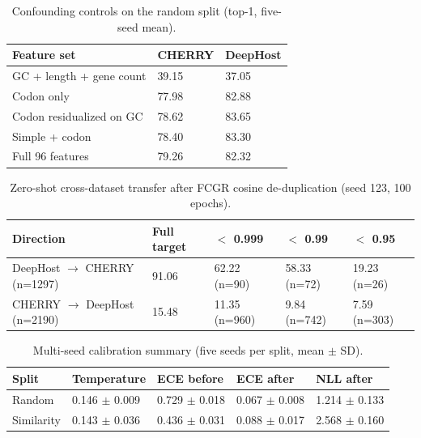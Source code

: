 \documentclass[utf8]{FrontiersinVancouver}
\begin{document}
\begin{table}[ht]
\centering
\renewcommand{\arraystretch}{1.25}
\caption{Confounding controls on the random split (top-1, five-seed mean).}\label{tab:7}
\small
\begin{tabular}{l l l}
\hline
Feature set & CHERRY & DeepHost \\
\hline
GC + length + gene count & 39.15 & 37.05 \\
Codon only & 77.98 & 82.88 \\
Codon residualized on GC & 78.62 & 83.65 \\
Simple + codon & 78.40 & 83.30 \\
Full 96 features & 79.26 & 82.32 \\
\hline
\end{tabular}
\end{table}

\begin{table}[ht]
\centering
\renewcommand{\arraystretch}{1.3}
\caption{Zero-shot cross-dataset transfer after FCGR cosine de-duplication (seed 123, 100 epochs).}\label{tab:8}
\footnotesize
\begin{tabular}{l l l l l}
\hline
Direction & Full target & $<$ 0.999 & $<$ 0.99 & $<$ 0.95 \\
\hline
DeepHost $\rightarrow$ CHERRY (n=1297) & 91.06 & 62.22 (n=90) & 58.33 (n=72) & 19.23 (n=26) \\
CHERRY $\rightarrow$ DeepHost (n=2190) & 15.48 & 11.35 (n=960) & 9.84 (n=742) & 7.59 (n=303) \\
\hline
\end{tabular}
\end{table}

\begin{table}[ht]
\centering
\renewcommand{\arraystretch}{1.25}
\caption{Multi-seed calibration summary (five seeds per split, mean $\pm$ SD).}\label{tab:9}
\footnotesize
\begin{tabular}{l l l l l}
\hline
Split & Temperature & ECE before & ECE after & NLL after \\
\hline
Random & 0.146 $\pm$ 0.009 & 0.729 $\pm$ 0.018 & 0.067 $\pm$ 0.008 & 1.214 $\pm$ 0.133 \\
Similarity & 0.143 $\pm$ 0.036 & 0.436 $\pm$ 0.031 & 0.088 $\pm$ 0.017 & 2.568 $\pm$ 0.160 \\
\hline
\end{tabular}
\end{table}



\end{document}
